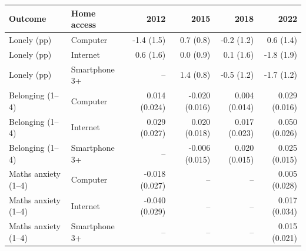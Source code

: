 \begin{tabular}{@{}llrrrr@{}}
\toprule
Outcome & Home access & 2012 & 2015 & 2018 & 2022 \\
\midrule
Lonely (pp) & Computer & -1.4 (1.5) & 0.7 (0.8) & -0.2 (1.2) & 0.6 (1.4) \\
Lonely (pp) & Internet & 0.6 (1.6) & 0.0 (0.9) & 0.1 (1.6) & -1.8 (1.9) \\
Lonely (pp) & Smartphone 3+ & -- & 1.4 (0.8) & -0.5 (1.2) & -1.7 (1.2) \\
Belonging (1--4) & Computer & 0.014 (0.024) & -0.020 (0.016) & 0.004 (0.014) & 0.029 (0.016) \\
Belonging (1--4) & Internet & 0.029 (0.027) & 0.020 (0.018) & 0.017 (0.023) & 0.050 (0.026) \\
Belonging (1--4) & Smartphone 3+ & -- & -0.006 (0.015) & 0.020 (0.015) & 0.025 (0.015) \\
Maths anxiety (1--4) & Computer & -0.018 (0.027) & -- & -- & 0.005 (0.028) \\
Maths anxiety (1--4) & Internet & -0.040 (0.029) & -- & -- & 0.017 (0.034) \\
Maths anxiety (1--4) & Smartphone 3+ & -- & -- & -- & 0.015 (0.021) \\
\bottomrule
\end{tabular}
